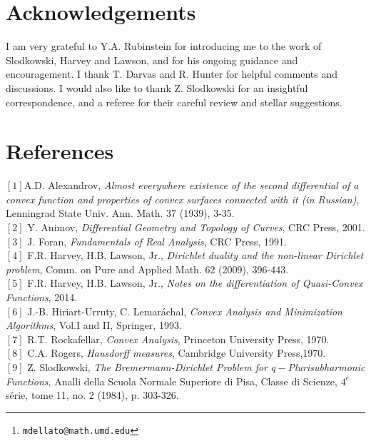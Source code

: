 \documentclass[10pt]{article}
\begin{document}
\section{Acknowledgements}
I am very grateful to Y.A. Rubinstein for introducing me to the work of Slodkowski, Harvey and Lawson, and for his ongoing guidance and encouragement. I thank T. Darvas and R. Hunter for helpful comments and discussions. I would also like to thank Z. Slodkowski for an insightful correspondence, and a referee for their careful review and stellar suggestions.

\section{\normalsize References}
\small 
$[1]$A.D. Alexandrov, \textit{Almost everywhere existence of the second differential of a convex function and properties of convex surfaces connected with it (in Russian)}, Lenningrad State Univ. Ann. Math. 37 (1939), 3-35.\\
$[2]$ Y. Animov, \textit{Differential Geometry and Topology of Curves}, CRC Press, 2001.\\
$[3]$ J. Foran, \textit{Fundamentals of Real Analysis}, CRC Press, 1991.\\
$[4]$ F.R. Harvey, H.B. Lawson, Jr., \textit{Dirichlet duality and the non-linear Dirichlet problem}, Comm. on Pure and Applied Math. 62 (2009), 396-443.\\
$[5]$ F.R. Harvey, H.B. Lawson, Jr., \textit{Notes on the differentiation of Quasi-Convex Functions}, 2014.\\
$[6]$ J.-B. Hiriart-Urruty, C. Lemar\'{a}chal, \textit{Convex Analysis and Minimization Algorithms}, Vol.I and II, Springer, 1993.\\
$[7]$ R.T. Rockafellar, \textit{Convex Analysis}, Princeton University Press, 1970.\\
$[8] $ C.A. Rogers, \textit{Hausdorff measures},  Cambridge University Press,1970.\\
$[9]$ Z. Slodkowski, \textit{The Bremermann-Dirichlet Problem for $q-$Plurisubharmonic Functions}, Analli della Scuola Normale Superiore di Pisa, Classe di Scienze, $4^e$ s\'{e}rie, tome 11, no. 2 (1984), p. 303-326. \vspace{10mm}\\ \normalsize
\author{University of Maryland \\
\thanks{\texttt{mdellato@math.umd.edu}}}
\end{document}
